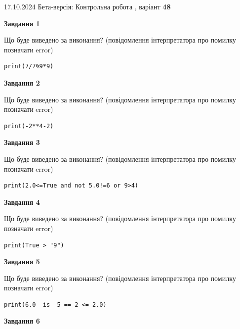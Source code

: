 \documentclass[12pt, ukrainian]{article}
\begin{document}
{\Large{17.10.2024 Бета-версія: Контрольна робота , варіант  \No \textbf { 48 }\par}}
{
\begin {large}
{\begin {center}\textbf{Завдання 1}\end {center}}

Що буде виведено за виконання? (повідомлення інтерпретатора про помилку позначати error)\par
\begin{verbatim}
print(7/7%9*9)
\end{verbatim}

{\begin {center}\textbf{Завдання 2}\end {center}}

Що буде виведено за виконання? (повідомлення інтерпретатора про помилку позначати error)\par
\begin{verbatim}
print(-2**4-2)
\end{verbatim}

{\begin {center}\textbf{Завдання 3}\end {center}}

Що буде виведено за виконання? (повідомлення інтерпретатора про помилку позначати error)\par
\begin{verbatim}
print(2.0<=True and not 5.0!=6 or 9>4)
\end{verbatim}

{\begin {center}\textbf{Завдання 4}\end {center}}

Що буде виведено за виконання? (повідомлення інтерпретатора про помилку позначати error)\par
\begin{verbatim}
print(True > "9")
\end{verbatim}

{\begin {center}\textbf{Завдання 5}\end {center}}

Що буде виведено за виконання? (повідомлення інтерпретатора про помилку позначати error)\par
\begin{verbatim}
print(6.0  is  5 == 2 <= 2.0)
\end{verbatim}

{\begin {center}\textbf{Завдання 6}\end {center}}


\end{large}}
\end{document}
